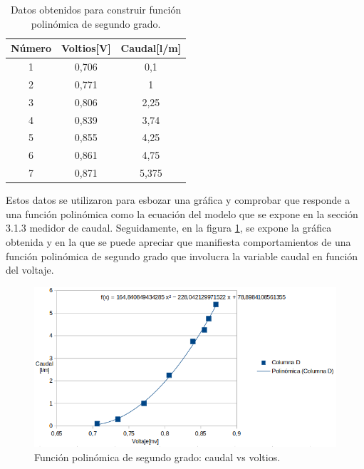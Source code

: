 \begin{table}[htpb]
	\centering
	\caption{Datos obtenidos para construir función polinómica de segundo grado.}
	\begin{tabular}{c c c }    
		\toprule
		\textbf{Número}   & \textbf{Voltios[V]} & \textbf{Caudal[l/m]}  \\
		\midrule
		1  & 0,706 & 0,1 \\
		2  & 0,771 & 1 \\
		3  & 0,806 & 2,25\\
		4  & 0,839 & 3,74 \\
		5  & 0,855 & 4,25  \\
		6  & 0,861 & 4,75 \\
		7  & 0,871 & 5,375 \\

		\bottomrule
		\hline
	\end{tabular}
	\label{tab:datos obtenidos para construir función polinómica de segundo grado.}
\end{table}
Estos datos se utilizaron para esbozar una gráfica y comprobar que responde a una función polinómica como la ecuación del modelo que se expone en la sección 3.1.3 medidor de caudal. Seguidamente, en la figura \ref{fig:Función polinomica de segundo grado: caudal vs voltios}, se expone la gráfica obtenida y en la que se puede apreciar que manifiesta comportamientos de una función polinómica de segundo grado que involucra la variable caudal en función del voltaje.

\begin{figure}[h]
	\centering
	\includegraphics[scale=.85]{./Figures/FuncionPolinomica-Caudal.png}
	\caption{Función polinómica de segundo grado: caudal vs voltios.}
\label{fig:Función polinomica de segundo grado: caudal vs voltios}
\end{figure}


